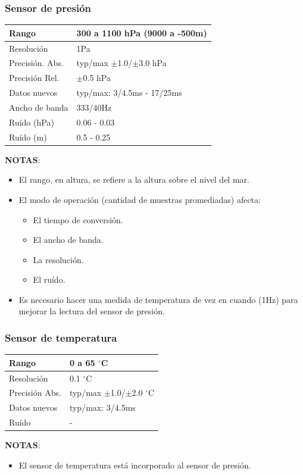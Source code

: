 \documentclass[main]{subfiles}
\begin{document}
\subsubsection{Sensor de presi\'on}

\begin{table}[H]
\begin{center}
\begin{tabular}{|p{3cm}|p{6.5cm}|}
\hline
Rango & 300 a 1100 hPa (9000 a -500m)\\
\hline
Resoluci\'on &  1Pa\\
\hline
Precisi\'on. Abs. & typ/max $\pm$1.0/$\pm$3.0 hPa \\
\hline
Precisi\'on Rel. & $\pm$0.5 hPa \\
\hline
Datos nuevos &  typ/max: 3/4.5ms - 17/25ms\\
\hline
Ancho de banda &  333/40Hz\\
\hline
Ru\'ido (hPa) &  0.06 - 0.03\\
\hline
Ru\'ido (m) & 0.5 - 0.25 \\
\hline
\end{tabular}
\label{tab:barometro}
\end{center}
\end{table}

\textbf{NOTAS}:
\begin{itemize}
\item El rango, en altura, se refiere a la altura sobre el nivel del mar.
\item El modo de operaci\'on (cantidad de muestras promediadas) afecta:
  \begin{itemize}
  \item El tiempo de conversi\'on.
  \item El ancho de banda.
  \item La resoluci\'on.
  \item El ru\'ido.
  \end{itemize}
\item Es necesario hacer una medida de temperatura de vez en cuando (1Hz) para mejorar la lectura del sensor de presi\'on.
\end{itemize}

\subsubsection{Sensor de temperatura}

\begin{table}[H]
\begin{center}
\begin{tabular}{|p{3cm}|p{6.5cm}|}
\hline
Rango & 0 a 65 $^\circ$C\\
\hline
Resoluci\'on &  0.1 $^\circ$C\\
\hline
Precisi\'on Abs. & typ/max $\pm$1.0/$\pm$2.0 $^\circ$C\\
\hline
Datos nuevos &  typ/max: 3/4.5ms\\
\hline
Ru\'ido & - \\
\hline
\end{tabular}
\label{tab:temp}
\end{center}
\end{table}

\textbf{NOTAS}:
\begin{itemize}
\item El sensor de temperatura est\'a incorporado al sensor de presi\'on.
\end{itemize}
\end{document}
